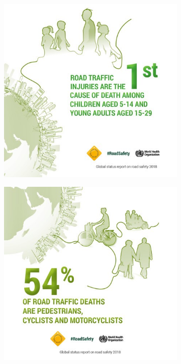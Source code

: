 \begin{figure}[!ht]
\begin{subfigure}[c]{0.3\textwidth}
		\includegraphics[width=\textwidth]{img/road_safety/1st-cause.jpg}
		\label{fig:test_image_2}
	\end{subfigure}
	\quad
	\begin{subfigure}[c]{0.3\textwidth}
		\includegraphics[width=\textwidth]{img/road_safety/54-percent-deaths.jpg}

\end{subfigure}
\end{figure}
